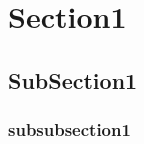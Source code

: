 \documentclass[a4paper,10pt]{article}
\begin{document}




\tableofcontents
\newpage

\section{Section1}
\subsection{SubSection1}
\subsubsection{subsubsection1}
\end{document}
